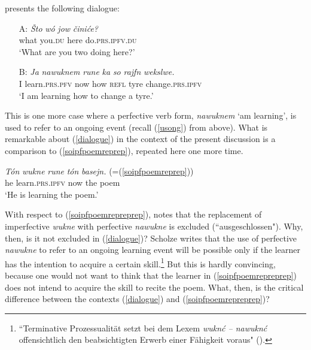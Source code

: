 \documentclass[output=paper,colorlinks,citecolor=brown]{langscibook}
\begin{document}
\citet[244]{Scholze2008} presents the following dialogue:

    \ea\label{dialogue}
\begin{itemize}
    \item[A:] \gll \textit{\v{S}to} \textit{w\'o} \textit{jow} \textit{\v{c}ini\'ce?} \\
what you.\textsc{du} here do.\textsc{prs.ipfv.du}\\
\glt \normalsize{`What are you two doing here?'}
\item[B:] \gll \textit{Ja} \textit{nawuknem} \textit{rune} \textit{ka} \textit{so} \textit{rajfn} \textit{wekslwe.} \\
I learn.\textsc{prs.pfv} now how \textsc{refl} tyre change.\textsc{prs.ipfv}\\
\glt \normalsize{`I am learning how to change a tyre.'}
\end{itemize}
\z

\noindent This is one more case where a perfective verb form, \textit{nawuknem} `am learning', is used to refer to an ongoing event (recall (\ref{usong}) from above). 
What is remarkable about (\ref{dialogue}) in the context of the present discussion is a comparison to (\ref{soipfpoemreprep}), repeated here one more time. 


  \ea\label{soipfpoemrepreprep}
\gll \textit{T\'on} \textit{wukne} \textit{rune} \textit{t\'on} \textit{basejn.} (=(\ref{soipfpoemreprep}))\\
he learn.\textsc{prs.ipfv} now the poem\\
\glt \normalsize{`He is learning the poem.'}
\z

\noindent With respect to (\ref{soipfpoemrepreprep}), \citet[245]{Scholze2008} notes that the replacement of imperfective \textit{wukne} with perfective \textit{nawukne} is excluded (``ausgeschlossen"). Why, then, is it not excluded in (\ref{dialogue})? Scholze writes that the use of perfective \textit{nawukne} to refer to an ongoing learning event will be possible only if the learner has the intention to acquire a certain skill.\footnote{``Terminative Prozessualit\"at setzt bei dem Lexem \textit{wukn\'c -- nawukn\'c} offensichtlich den beabsichtigten Erwerb einer F\"ahigkeit voraus" (\citealt[245]{Scholze2008}).} But this is hardly convincing, because one would not want to think that the learner in (\ref{soipfpoemrepreprep}) does not intend to acquire the skill to recite the poem. What, then, is the critical difference between the contexts (\ref{dialogue}) and (\ref{soipfpoemrepreprep})?
\end{document}
